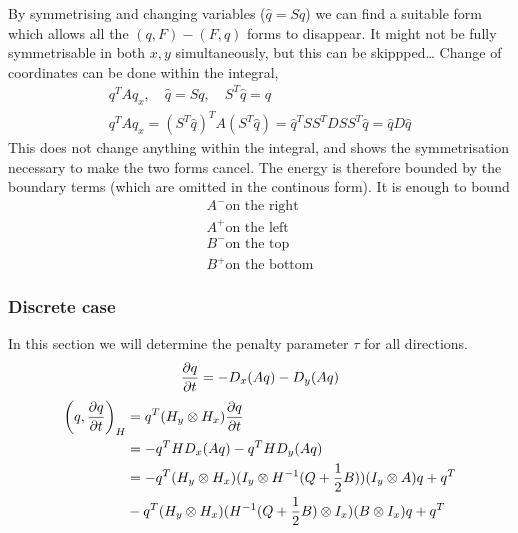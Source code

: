 \documentclass[british]{scrartcl}
\newcommand{\kron}{\otimes}
\begin{document}
By symmetrising and changing variables ($\hat{q} = Sq$) we can find a suitable form which allows all the $(q, F) - (F, q)$ forms to disappear. It might not be fully symmetrisable in both $x,y$ simultaneously, but this can be skippped\ldots
Change of coordinates can be done within the integral,
\begin{gather}
    q^T A q_x, \hspace{1em} \hat{q} = Sq, \hspace{1em} S^T \hat{q} = q \\
    q^T A q_x = {(S^T \hat{q})}^T A (S^T \hat{q}) = \hat{q}^T S S^T D S S^T \hat{q} = \hat{q}D\hat{q}
\end{gather}
This does not change anything within the integral, and shows the symmetrisation necessary to make the two forms cancel. The energy is therefore bounded by the boundary terms (which are omitted in the continous form). It is enough to bound
\begin{gather}
    A^- \text{on the right} \\
    A^+ \text{on the left} \\
    B^- \text{on the top} \\
    B^+ \text{on the bottom}
\end{gather}

\subsubsection{Discrete case}
In this section we will determine the penalty parameter $\tau$ for all directions.
\begin{gather}
    \pdv{q}{t} = - D_x (Aq) - D_y (Aq) \\
\end{gather}
\begin{align}
    {\left(q, \pdv{q}{t}\right)}_H &= q^T (H_y \kron H_x) \pdv{q}{t} \\
    &= - q^T H D_x (Aq) - q^T H D_y (Aq) \\
    &= -q^T (H_y \kron H_x) (I_y \kron H^{-1} (Q + \frac{1}{2}B )) (I_y \kron A) q + q^T \\
    &- q^T (H_y \kron H_x) (H^{-1} (Q + \frac{1}{2}B ) \kron I_x) (B \kron I_x) q + q^T
\end{align}
\end{document}
